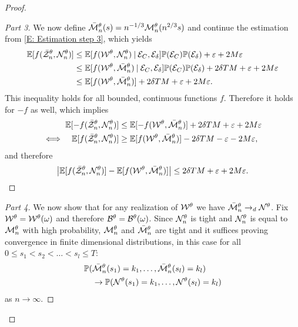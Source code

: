 \begin{proof}
\begin{proof}[Part 3]
We now define $\bar{\mathcal{M}}_n^{\theta}(s) = n^{-1 / 3} \mathcal{M}_n^{\theta}(n^{2 / 3}s)$ and continue the estimation from \eqref{E: Estimation step 3},
which yields
\begin{equation*} \label{E: Estimation step 4}
\begin{aligned}
\mathbb{E}[f(\bar{\mathcal{Z}}^{\theta}_n, \mathcal{N}_n^{\theta})] 
&\leq \mathbb{E}[f(\mathcal{W}^{\theta}, \mathcal{N}_n^{\theta}) \: | \: \mathcal{E}_{C}, \mathcal{E}_{\delta}] \mathbb{P}(\mathcal{E}_{C}) \mathbb{P}(\mathcal{E}_{\delta}) + \varepsilon + 2M\varepsilon   \\
&\leq \mathbb{E}[f(\mathcal{W}^{\theta}, \bar{\mathcal{M}}_n^{\theta}) \: | \: \mathcal{E}_{C}, \mathcal{E}_{\delta}] \mathbb{P}(\mathcal{E}_{C}) \mathbb{P}(\mathcal{E}_{\delta}) + 2\delta T M + \varepsilon  + 2M\varepsilon \\
&\leq \mathbb{E}[f(\mathcal{W}^{\theta}, \bar{\mathcal{M}}_n^{\theta})] + 2\delta T M + \varepsilon  + 2M\varepsilon.
\end{aligned}
\end{equation*}
This inequality holds for all bounded, continuous functions $f$. 
Therefore it holds for $-f$ as well, which implies
\begin{equation*}
\begin{aligned}
\mathbb{E}[-f(\bar{\mathcal{Z}}^{\theta}_n, \mathcal{N}_n^{\theta})] &\leq \mathbb{E}[-f(\mathcal{W}^{\theta}, \bar{\mathcal{M}}_n^{\theta}) ]+ 2\delta T M  + \varepsilon + 2M\varepsilon \\
\iff\hspace{8pt}  \mathbb{E}[f(\bar{\mathcal{Z}}^{\theta}_n, \mathcal{N}_n^{\theta})] &\geq \mathbb{E}[f(\mathcal{W}^{\theta}, \bar{\mathcal{M}}_n^{\theta}) ] - 2\delta T M  - \varepsilon - 2M\varepsilon,
\end{aligned}
\end{equation*}
and therefore
\begin{equation} \label{E: Equality of Expectations}
	\left|\mathbb{E}[f(\bar{\mathcal{Z}}^{\theta}_n, \mathcal{N}_n^{\theta})] - \mathbb{E}[f(\mathcal{W}^{\theta}, \bar{\mathcal{M}}_n^{\theta})] \right| \leq 2\delta T M + \varepsilon  + 2M\varepsilon.
\end{equation}
\end{proof}

\begin{proof}[Part 4]
We now show that for any realization of $\mathcal{W}^{\theta}$ we have $\bar{\mathcal{M}}_n^{\theta} \rightarrow_d \mathcal{N}^{\theta}$.
Fix $\mathcal{W}^{\theta} = \mathcal{W}^{\theta}(\omega)$ and therefore $\mathcal{B}^{\theta} = \mathcal{B}^{\theta}(\omega)$.
Since $\mathcal{N}_n^{\theta}$ is tight and $\mathcal{N}_n^{\theta}$ is equal to $\mathcal{M}_n^{\theta}$ with high probability,
$\mathcal{M}_n^{\theta}$ and $\bar{\mathcal{M}}_n^{\theta}$ are tight and it suffices proving convergence in finite dimensional distributions,
in this case for all $0 \leq s_1 < s_2 < \dots < s_l \leq T$:
\begin{equation} \label{E: convergence fdd}
\begin{aligned}
&\mathbb{P}( \bar{\mathcal{M}}_n^{\theta}(s_1) = k_1, \dots, \bar{\mathcal{M}}_n^{\theta}(s_l) = k_l ) \\
&\quad \rightarrow  \mathbb{P}( \mathcal{N}^{\theta}(s_1) = k_1, \dots, \mathcal{N}^{\theta}(s_l) = k_l )
\end{aligned}
\end{equation}
as $n \rightarrow \infty$.


\end{proof}
\end{proof}
